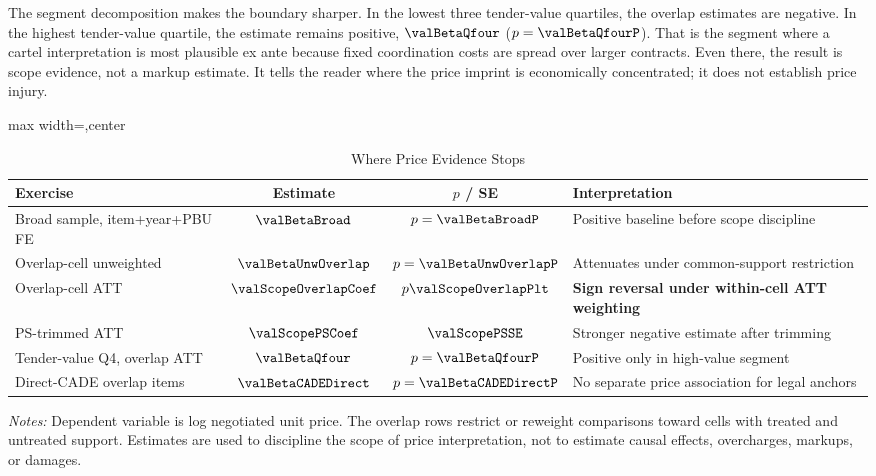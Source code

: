 The segment decomposition makes the boundary sharper. In the
lowest three tender-value quartiles, the overlap estimates are
negative. In the highest tender-value quartile, the estimate
remains positive, $\valBetaQfour$ ($p=\valBetaQfourP$). That is
the segment where a cartel interpretation is most plausible ex
ante because fixed coordination costs are spread over larger
contracts. Even there, the result is scope evidence, not a
markup estimate. It tells the reader where the price imprint is
economically concentrated; it does not establish price injury.

\begin{table}[htbp]
\centering
\caption{Where Price Evidence Stops}
\label{tab:price_scope_submission}
\footnotesize
\begin{adjustbox}{max width=\textwidth,center}
\begin{threeparttable}
\begin{tabular}{p{5.2cm}ccp{4.8cm}}
\toprule
Exercise & Estimate & $p$ / SE & Interpretation \\
\midrule
Broad sample, item+year+PBU FE & $\valBetaBroad$ &
$p=\valBetaBroadP$ & Positive baseline before scope discipline \\
Overlap-cell unweighted & $\valBetaUnwOverlap$ &
$p=\valBetaUnwOverlapP$ & Attenuates under common-support restriction \\
Overlap-cell ATT & $\valScopeOverlapCoef$ &
$p\valScopeOverlapPlt$ & \textbf{Sign reversal under within-cell ATT weighting} \\
PS-trimmed ATT & $\valScopePSCoef$ &
$\valScopePSSE$ & Stronger negative estimate after trimming \\
Tender-value Q4, overlap ATT & $\valBetaQfour$ &
$p=\valBetaQfourP$ & Positive only in high-value segment \\
Direct-CADE overlap items & $\valBetaCADEDirect$ &
$p=\valBetaCADEDirectP$ & No separate price association for legal anchors \\
\bottomrule
\end{tabular}
\begin{tablenotes}
\footnotesize
\item \textit{Notes:} Dependent variable is log negotiated unit
price. The overlap rows restrict or reweight comparisons toward
cells with treated and untreated support. Estimates are used to
discipline the scope of price interpretation, not to estimate
causal effects, overcharges, markups, or damages.
\end{tablenotes}
\end{threeparttable}
\end{adjustbox}
\end{table}

